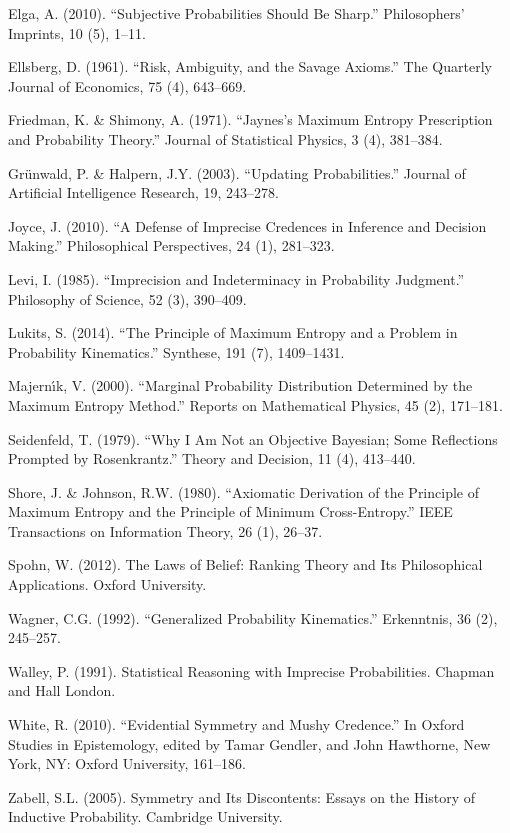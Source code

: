 \documentclass[11pt]{article}
\begin{document}
Elga, A. (2010). ``Subjective Probabilities Should Be Sharp.'' Philosophers' Imprints, 10 (5), 1--11.

Ellsberg, D. (1961). ``Risk, Ambiguity, and the Savage Axioms.'' The Quarterly Journal of Economics, 75 (4), 643--669.

Friedman, K. \& Shimony, A. (1971). ``Jaynes's Maximum Entropy Prescription and Probability Theory.'' Journal of Statistical Physics, 3 (4), 381--384.

Gr{\"u}nwald, P. \& Halpern, J.Y. (2003). ``Updating Probabilities.'' Journal of Artificial Intelligence Research, 19, 243--278.

Joyce, J. (2010). ``A Defense of Imprecise Credences in Inference and Decision Making.'' Philosophical Perspectives, 24 (1), 281--323.

Levi, I. (1985). ``Imprecision and Indeterminacy in Probability Judgment.'' Philosophy of Science, 52 (3), 390--409.

Lukits, S. (2014). ``The Principle of Maximum Entropy and a Problem in Probability Kinematics.'' Synthese, 191 (7), 1409--1431.

Majern{\'\i}k, V. (2000). ``Marginal Probability Distribution Determined by the Maximum Entropy Method.'' Reports on Mathematical Physics, 45 (2),  171--181.

Seidenfeld, T. (1979). ``Why I Am Not an Objective Bayesian; Some Reflections Prompted by Rosenkrantz.'' Theory and Decision, 11 (4), 413--440.

Shore, J. \& Johnson, R.W. (1980). ``Axiomatic Derivation of the Principle of Maximum Entropy and the Principle of Minimum Cross-Entropy.'' IEEE Transactions on Information Theory, 26 (1), 26--37.

Spohn, W. (2012). The Laws of Belief: Ranking Theory and Its Philosophical Applications. Oxford University.

Wagner, C.G. (1992). ``Generalized Probability Kinematics.'' Erkenntnis, 36 (2), 245--257.

Walley, P. (1991). Statistical Reasoning with Imprecise Probabilities. Chapman and Hall London.

White, R. (2010). ``Evidential Symmetry and Mushy Credence.'' In Oxford Studies in Epistemology, edited by Tamar Gendler, and John Hawthorne, New York, NY: Oxford University, 161--186.

Zabell, S.L. (2005). Symmetry and Its Discontents: Essays on the History of Inductive Probability. Cambridge University.

% 
% 
% 
\end{document}

